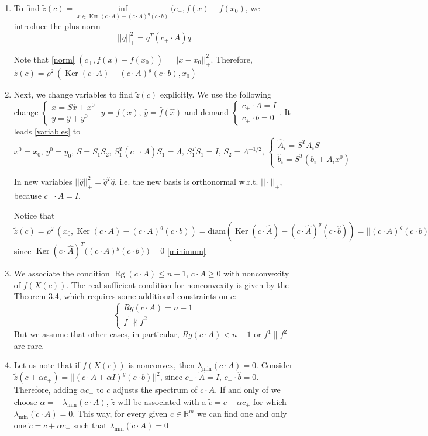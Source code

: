 \documentclass[a4paper]{article}
\DeclareMathOperator{\Rg}{Rg}
\DeclareMathOperator{\Ker}{Ker}
\begin{document}
\begin{enumerate}
\item To find $\tilde{z}(c)=\inf\limits_{x\in \Ker(c\cdot A)-(c\cdot A)^g(c\cdot b)}(c_+,f(x)-f(x_0)$, we introduce the plus norm
$$||q||^2_+=q^T(c_+\cdot A)q$$

Note that \ref{norm} $(c_+,f(x)-f(x_0))=||x-x_0||_+^2$.
Therefore, $\tilde{z}(c)=\rho_+^2(\Ker(c\cdot A)-(c\cdot A)^g(c\cdot b),x_0)$
\item Next, we change variables to find $\tilde{z}(c)$ explicitly. We use the following change
$\begin{cases}
x=S\hat{x}+x^0\\
y=\hat{y}+y^0
\end{cases}$ $y=f(x)$, $\hat{y}=\hat{f}(\hat{x})$ and demand $\begin{cases}
c_+\cdot A=I\\
c_+\cdot b=0
\end{cases}$. It leads \ref{variables} to
$$x^0=x_0,\,y^0=y_0,\,S=S_1S_2,\, S_1^T(c_+\cdot A)S_1=\Lambda,\,S_1^TS_1=I,\,S_2=\Lambda^{-1/2},\,\begin{cases}
\hat{A}_i=S^TA_iS\\
\hat{b}_i=S^T(b_i+A_ix^0)
\end{cases}$$

In new variables $||\hat{q}||_+^2=\hat{q}^T\hat{q}$, i.e. the new basis is orthonormal w.r.t. $||\cdot||_+$, because $c_+\cdot A=I$.


Notice that $\tilde{z}(c)=\rho_+^2(x_0,\Ker (c\cdot A)-(c\cdot A)^g(c\cdot b))=\mathrm{diam}(\Ker(c\cdot \hat{A})-(c\cdot \hat{A})^g(c\cdot \hat{b}))=||(c\cdot A)^g(c\cdot b)||^2$ since $\Ker(c\cdot \hat{A})^T\big((c\cdot A)^g(c\cdot b)\big)=0$ \ref{minimum}

\item We associate the condition $\Rg(c\cdot A)\leqslant n-1$, $c\cdot A\geqslant 0$ with nonconvexity of $f(X(c))$. The real sufficient condition for nonconvexity is given by the Theorem 3.4, which requires some additional constraints on $c$:
$$
\begin{cases}
Rg(c\cdot A)=n-1\\
f^1\nparallel f^2
\end{cases}
$$
But we assume that other cases, in particular, $Rg(c\cdot A)<n-1$ or $f^1\parallel f^2$ are rare.

\item Let us note that if $f(X(c))$ is nonconvex, then $\lambda_{\min}(c\cdot A)=0$. Consider $\tilde{z}(c+\alpha c_+)=||(c\cdot A+\alpha I)^g(c\cdot b)||^2$, since $c_+\cdot\hat{A}=I,\,c_+\cdot\hat{b}=0$. Therefore, adding $\alpha c_+$ to $c$ adjusts the spectrum of $c\cdot A$. If and only of we choose $\alpha=-\lambda_{\min}(c\cdot A)$, $\tilde{z}$ will be associated with a $\tilde{c}=c+\alpha c_+$ for which $\lambda_{\min}(\tilde{c}\cdot A)=0$. This way, for every given $c\in\mathbb{R}^m$ we can find one and only one $\tilde{c}=c+\alpha c_+$ such that $\lambda_{\min}(\tilde{c}\cdot A)=0$


\end{enumerate}
\end{document}
